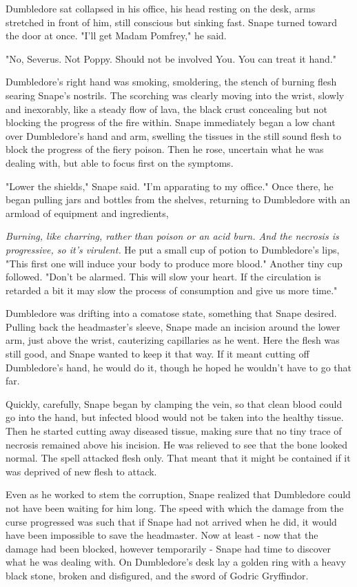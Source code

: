 Dumbledore sat collapsed in his office, his head resting on the desk, arms stretched in front of him, still conscious but sinking fast. Snape turned toward the door at once. "I'll get Madam Pomfrey," he said.

"No, Severus. Not Poppy. Should not be involved{\el} You. You can treat it{\el} hand."

Dumbledore's right hand was smoking, smoldering, the stench of burning flesh searing Snape's nostrils. The scorching was clearly moving into the wrist, slowly and inexorably, like a steady flow of lava, the black crust concealing but not blocking the progress of the fire within. Snape immediately began a low chant over Dumbledore's hand and arm, swelling the tissues in the still sound flesh to block the progress of the fiery poison. Then he rose, uncertain what he was dealing with, but able to focus first on the symptoms.

"Lower the shields," Snape said. "I'm apparating to my office." Once there, he began pulling jars and bottles from the shelves, returning to Dumbledore with an armload of equipment and ingredients,

\emph{Burning, like charring, rather than poison or an acid burn. And the necrosis is progressive, so it's virulent.} He put a small cup of potion to Dumbledore's lips, "This first one will induce your body to produce more blood." Another tiny cup followed. "Don't be alarmed. This will slow your heart. If the circulation is retarded a bit it may slow the process of consumption and give us more time."

Dumbledore was drifting into a comatose state, something that Snape desired. Pulling back the headmaster's sleeve, Snape made an incision around the lower arm, just above the wrist, cauterizing capillaries as he went. Here the flesh was still good, and Snape wanted to keep it that way. If it meant cutting off Dumbledore's hand, he would do it, though he hoped he wouldn't have to go that far.

Quickly, carefully, Snape began by clamping the vein, so that clean blood could go into the hand, but infected blood would not be taken into the healthy tissue. Then he started cutting away diseased tissue, making sure that no tiny trace of necrosis remained above his incision. He was relieved to see that the bone looked normal. The spell attacked flesh only. That meant that it might be contained if it was deprived of new flesh to attack.

Even as he worked to stem the corruption, Snape realized that Dumbledore could not have been waiting for him long. The speed with which the damage from the curse progressed was such that if Snape had not arrived when he did, it would have been impossible to save the headmaster. Now at least - now that the damage had been blocked, however temporarily - Snape had time to discover what he was dealing with. On Dumbledore's desk lay a golden ring with a heavy black stone, broken and disfigured, and the sword of Godric Gryffindor.

